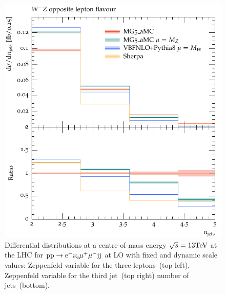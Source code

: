 \documentclass[11pt]{cernrep}
\begin{document}
\begin{figure}[htbp]
\begin{center}
   \includegraphics[scale=0.5]{figs/WmZ_OF_nJets}
\caption{Differential distributions at a centre-of-mass energy $\sqrt{s}=13{\rm TeV}$ at the LHC for ${\rm p} {\rm p} \to {\rm e}^-  \nu_{\rm e}  \mu^+ \mu^- {\rm j} {\rm j}$ at LO with fixed and dynamic scale values: 
                Zeppenfeld variable for the three leptons~(top left),
                Zeppenfeld variable for the third jet~(top right)
                number of jets~(bottom).}
\label{vbs_fig_shower_3b}
\end{center}
\end{figure}
\end{document}
